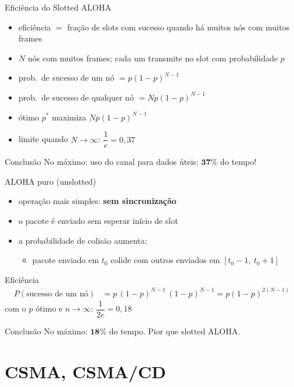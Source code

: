 \documentclass[aspectratio=169,11pt]{beamer}
\begin{document}
\begin{frame}{Eficiência do Slotted ALOHA}
  \begin{itemize}
    \item eficiência $=$ fração de slots com sucesso quando há muitos nós com muitos frames
    \item $N$ nós com muitos frames; cada um transmite no slot com probabilidade $p$
    \item prob.\ de sucesso de um nó $= p(1-p)^{N-1}$
    \item prob.\ de sucesso de qualquer nó $= Np(1-p)^{N-1}$
    \item ótimo $p^*$ maximiza $Np(1-p)^{N-1}$
    \item limite quando $N\to\infty$: $\dfrac{1}{e} = 0{,}37$
  \end{itemize}
  \begin{alertblock}{Conclusão}
    No máximo: uso do canal para dados úteis: $\mathbf{37\%}$ do tempo!
  \end{alertblock}
\end{frame}

\begin{frame}{ALOHA puro (unslotted)}
  \begin{itemize}
    \item operação mais simples: \textbf{sem sincronização}
    \item o pacote é enviado sem esperar início de slot
    \item a probabilidade de colisão aumenta:
      \begin{itemize}
        \item pacote enviado em $t_0$ colide com outros enviados em $[t_0-1,\ t_0+1]$
      \end{itemize}
  \end{itemize}
  \begin{block}{Eficiência}
    \begin{align*}
      P(\text{sucesso de um nó}) &= p\,(1-p)^{N-1}\,(1-p)^{N-1} = p(1-p)^{2(N-1)}
    \end{align*}
    com o $p$ ótimo e $n\to\infty$: $\dfrac{1}{2e} = 0{,}18$
  \end{block}
  \begin{alertblock}{Conclusão}
    No máximo: $\mathbf{18\%}$ do tempo. Pior que slotted ALOHA.
  \end{alertblock}
\end{frame}

\section{CSMA, CSMA/CD}
\end{document}
